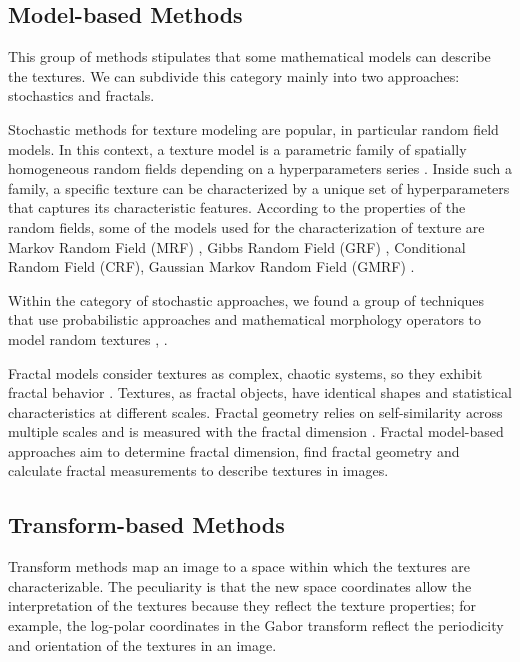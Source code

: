 \subsection{Model-based Methods}
This group of methods stipulates that some mathematical models can describe the textures. We can subdivide this category mainly into two approaches: stochastics and fractals.

Stochastic methods for texture modeling are popular, in particular random field models. In this context, a texture model is a parametric family of spatially homogeneous random fields depending on a hyperparameters series \citep{Winkler:Book:2003}. Inside such a family, a specific texture can be characterized by a unique set of hyperparameters that captures its characteristic features. According to the properties of the random fields, some of the models used for the characterization of texture are Markov Random Field (MRF) \citep{Hassner.Sklansky:CGIM:1980, Cross.Jain:PAMI:1983}, Gibbs Random Field (GRF) \citep{Derin.Cole:CVGIM:1986}, Conditional Random Field (CRF), Gaussian Markov Random Field (GMRF) \citep{Cohen.Fan.ea:PAMI:1991}.

Within the category of stochastic approaches, we found a group of techniques that use probabilistic approaches and mathematical morphology operators to model random textures \citep{Serra:CGIM:1980}, \citep{Cord.Bach.ea:JoM:2010}.

Fractal models consider textures as complex, chaotic systems, so they exhibit fractal behavior \citep{Petrolekas.Mitra:ISOP:1993}. Textures, as fractal objects, have identical shapes and statistical characteristics at different scales. Fractal geometry relies on self-similarity across multiple scales and is measured with the fractal dimension \citep{Keller.Chen.ea:CVGIP:1989}. Fractal model-based approaches aim to determine fractal dimension, find fractal geometry and calculate fractal measurements to describe textures in images.


\subsection{Transform-based Methods}
Transform methods map an image to a space within which the textures are characterizable. The peculiarity is that the new space coordinates allow the interpretation of the textures because they reflect the texture properties; for example, the log-polar coordinates in the Gabor transform reflect the periodicity and orientation of the textures in an image.

